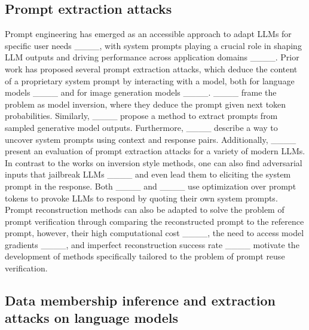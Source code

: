 
\subsection{Prompt extraction attacks}
Prompt engineering has emerged as an accessible approach to adapt LLMs for specific user needs ____, with system prompts playing a crucial role in shaping LLM outputs and driving performance across application domains ____.
Prior work has proposed several prompt extraction attacks, which deduce the content of a proprietary system prompt by interacting with a model, both for language models ____ and for image generation models ____. 
____ frame the problem as model inversion, where they deduce the prompt given next token probabilities.
Similarly, ____ propose a method to extract prompts from sampled generative model outputs. 
Furthermore, ____ describe a way to uncover system prompts using context and response pairs.
Additionally, ____ present an evaluation of prompt extraction attacks for a variety of modern LLMs. 
In contrast to the works on inversion style methods, one can also find adversarial inputs that jailbreak LLMs ____ and even lead them to eliciting the system prompt in the response. Both ____ and ____ use optimization over prompt tokens to provoke LLMs to respond by quoting their own system prompts. Prompt reconstruction methods can also be adapted to solve the problem of prompt verification through comparing the reconstructed prompt to the reference prompt, however, their high computational cost ____, the need to access model gradients ____, and imperfect reconstruction success rate ____ motivate the development of methods specifically tailored to the problem of prompt reuse verification.

\subsection{Data membership inference and extraction attacks on language models}


